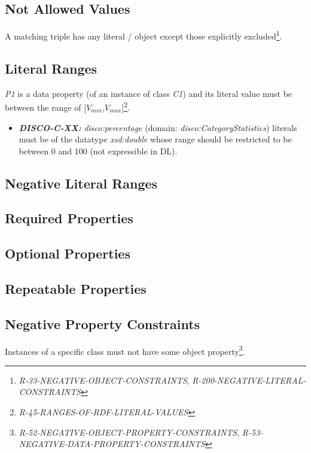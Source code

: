 \documentclass{llncs}
\begin{document}
\subsection{Not Allowed Values}

A matching triple has any literal / object except those explicitly excluded\footnote{\emph{R-33-NEGATIVE-OBJECT-CONSTRAINTS}, \emph{R-200-NEGATIVE-LITERAL-CONSTRAINTS}}.

\subsection{Literal Ranges}

\emph{P1} is a data property (of an instance of class \emph{C1}) and its literal value must be between the range of [$V_{min}$,$V_{max}$]\footnote{{\em R-45-RANGES-OF-RDF-LITERAL-VALUES}}.

\begin{itemize}
	\item \textbf{{\em DISCO-C-XX:}}
{\em disco:percentage} (domain: {\em disco:CategoryStatistics}) literals must be of the datatype {\em xsd:double} whose range should be restricted to be between 0 and 100 (not expressible in DL).
\end{itemize}

\subsection{Negative Literal Ranges}

\subsection{Required Properties}

\subsection{Optional Properties}

\subsection{Repeatable Properties}

\subsection{Negative Property Constraints}

Instances of a specific class must not have some object property\footnote{\emph{R-52-NEGATIVE-OBJECT-PROPERTY-CONSTRAINTS}, \emph{R-53-NEGATIVE-DATA-PROPERTY-CONSTRAINTS}}.
\end{document}
